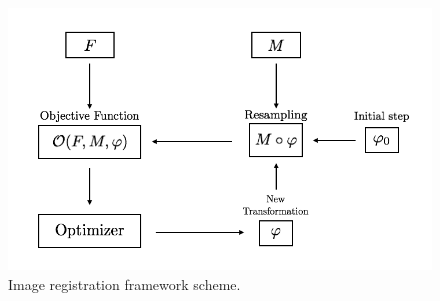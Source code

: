 \begin{figure}[!ht]
	\centering
	\includegraphics[scale=0.35]{figures/iterative_algorithm.png}
	\caption{Image registration framework scheme.}
	\label{fig:iterative_algorithm_scheme}
\end{figure}

